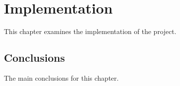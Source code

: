 \chapter{Implementation}\label{ch:Implementation}

This chapter examines the implementation of the project.

\section{Conclusions}

The main conclusions for this chapter.


